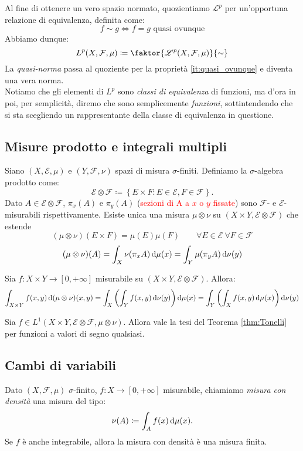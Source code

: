 Al fine di ottenere un vero spazio normato, quozientiamo $ \mathscr{L}^p $ per un'opportuna relazione di equivalenza, definita come:
\[ f \sim g \iff f = g \text{ quasi ovunque} \]
Abbiamo dunque:
\[ L^p(X,\mathcal{F},\mu) \coloneqq \faktor{\mathscr{L}^p(X,\mathcal{F},\mu)}{\sim} \]
La \emph{quasi-norma} passa al quoziente per la proprietà \eqref{it:quasi_ovunque} e diventa una vera norma. \\

Notiamo che gli elementi di $ L^p $ sono \emph{classi di equivalenza} di funzioni, ma d'ora in poi, per semplicità, diremo che sono semplicemente \emph{funzioni}, sottintendendo che si sta scegliendo un rappresentante della classe di equivalenza in questione.

\subsection{Misure prodotto e integrali multipli}
Siano $ (X,\mathcal{E},\mu) $ e $ (Y,\mathcal{F},\nu) $ spazi di misura $ \sigma $-finiti. Definiamo la $ \sigma $-algebra prodotto come:
\[ 
    \mathcal{E} \otimes \mathcal{F} \coloneqq \left\{ E\times F : E \in \mathcal{E}, F \in \mathcal{F} \right\}. 
\]
Dato $ A \in \mathcal{E}\otimes\mathcal{F} $, $ \pi_x(A) $ e $ \pi_y(A) $ (\textcolor{red}{sezioni di A a $ x $ o $ y $ fissate}) sono $ \mathcal{F} $- e $ \mathcal{E} $-misurabili rispettivamente.
Esiste unica una misura $ \mu\otimes\nu $ su $ (X\times Y, \mathcal{E}\otimes\mathcal{F}) $ che estende
\[ 
    (\mu\otimes\nu)(E\times F) = \mu(E)\mu(F) \qquad \forall E\in\mathcal{E}\ \forall F\in\mathcal{F} 
\]
\[
    (\mu\otimes\nu)(A) = \int_X \nu(\pi_x A)\dif\mu(x) = \int_Y \mu(\pi_y A)\dif\nu(y) 
\]

\begin{thm}[Tonelli]\label{thm:Tonelli}
    Sia $ f\colon X\times Y \to [0,+\infty] $ misurabile su $ (X\times Y,\mathcal{E}\otimes\mathcal{F}) $. Allora:
    \[ \int_{X\times Y} f(x,y)\dif{(\mu\otimes\nu)}(x,y) = \int_X \left( \int_Y f(x,y) \dif\nu(y) \right) \dif\mu(x) = \int_Y \left( \int_X f(x,y) \dif\mu(x) \right) \dif\nu(y) \]
\end{thm}

\begin{thm}[Fubini]
    Sia $ f \in L^1(X\times Y,\mathcal{E}\otimes\mathcal{F},\mu\otimes\nu) $. Allora vale la tesi del Teorema \ref{thm:Tonelli} per funzioni a valori di segno qualsiasi.
\end{thm}

\subsection{Cambi di variabili}
Dato $ (X,\mathcal{F},\mu) $ $ \sigma $-finito, $ f\colon X\to[0,+\infty] $ misurabile, chiamiamo \emph{misura con densità} una misura del tipo:
\[ \nu(A) \coloneqq \int_A f(x)\dif\mu(x). \]
Se $ f $ è anche integrabile, allora la misura con densità è una misura finita.

